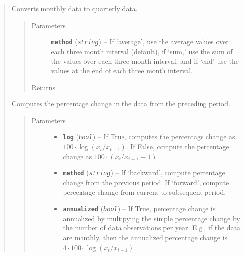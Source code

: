 \documentclass[letterpaper,10pt,english]{sphinxmanual}
\begin{document}
\begin{fulllineitems}
\begin{quote}
\begin{fulllineitems}
\label{series_class:fredpy.series.monthtoquarter}
Converts monthly data to quarterly data.
\begin{quote}\begin{description}
\item[{Parameters}] \leavevmode
\textbf{\texttt{method}} (\emph{\texttt{string}}) -- If `average', use the average values over each three month interval (default), if `sum,' use the sum of the values over each three month interval, and if `end' use the values at the end of each three month interval.

\item[{Returns}] \leavevmode
{\hyperref[series_class:fredpy.series]{}}

\end{description}\end{quote}

\end{fulllineitems}


\begin{fulllineitems}
\label{series_class:fredpy.series.pc}
Computes the percentage change in the data from the preceding period.
\begin{quote}\begin{description}
\item[{Parameters}] \leavevmode\begin{itemize}
\item {} 
\textbf{\texttt{log}} (\emph{\texttt{bool}}) -- If True, computes the percentage change as \(100\cdot\log(x_{t}/x_{t-1})\). If False, compute the percentage change as \(100\cdot\left( x_{t}/x_{t-1} - 1\right)\).

\item {} 
\textbf{\texttt{method}} (\emph{\texttt{string}}) -- If `backward', compute percentage change from the previous period. If `forward', compute percentage change from current to subsequent period.

\item {} 
\textbf{\texttt{annualized}} (\emph{\texttt{bool}}) -- If True, percentage change is annualized by multipying the simple percentage change by the number of data observations per year. E.g., if the data are monthly, then the annualized percentage change is \(4\cdot 100\cdot\log(x_{t}/x_{t-1})\).


\end{itemize}
\end{description}
\end{quote}
\end{fulllineitems}
\end{quote}
\end{fulllineitems}
\end{document}
